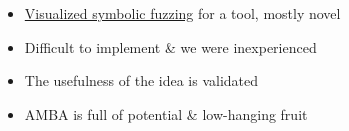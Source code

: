 \begin{frame}
	\begin{itemize}

        \item \underline{Visualized symbolic fuzzing} for a tool, mostly novel

		\item Difficult to implement \& we were inexperienced

		\item The usefulness of the idea is validated

		\item AMBA is full of potential \& low-hanging fruit

	\end{itemize}
	\vfill
\end{frame}
